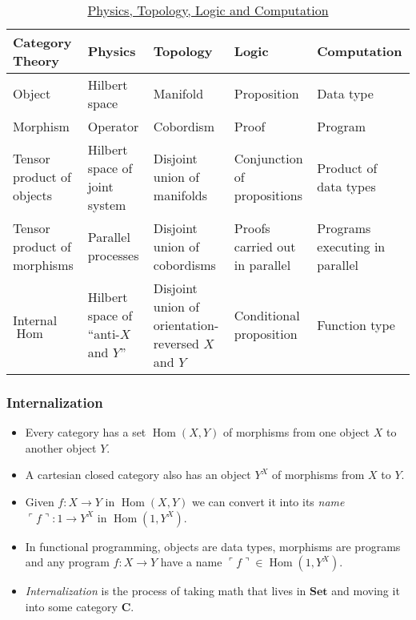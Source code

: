 \documentclass[UTF8,11pt,colorlinks,compress,openany]{beamer}%
\begin{document}
\begin{frame}\frametitle{}
\begin{table}[H]
	\begin{tabu}{p{.165\textwidth}|p{.165\textwidth}|p{.165\textwidth}|p{.165\textwidth}|p{.165\textwidth}}
	\hline
	\textbf{Category Theory} & \textbf{Physics} & \textbf{Topology} & \textbf{Logic} & \textbf{Computation}\\
	\hline
	Object & Hilbert space & Manifold & Proposition & Data type\\
	\hline
	Morphism & Operator & Cobordism & Proof & Program\\
	\hline
	Tensor product of objects & Hilbert space of joint system & Disjoint union of manifolds & Conjunction of propositions & Product of data types\\
	\hline
	Tensor product of morphisms & Parallel processes & Disjoint union of cobordisms & Proofs carried out in parallel & Programs executing in parallel\\
	\hline
	Internal $\operatorname{Hom}$ & Hilbert space of ``anti-$X$ and $Y$'' & Disjoint union of orientation-reversed $X$ and $Y$ & Conditional proposition & Function type\\
	\hline
	\end{tabu}\caption{\href{https://arxiv.org/abs/0903.0340}{Physics, Topology, Logic and Computation}}
\end{table}
\end{frame}

\begin{frame}\frametitle{Internalization}
\begin{itemize}
	\item Every category has a set $\operatorname{Hom}(X,Y)$ of morphisms from one object $X$ to another object $Y$.
	\item A cartesian closed category also has an object $Y^X$ of morphisms from $X$ to $Y$.
	\item Given $f: X\to Y$ in $\operatorname{Hom}(X,Y)$ we can convert it into its \emph{name} $\ulcorner f\urcorner: 1\to Y^X$ in $\operatorname{Hom}(1,Y^X)$.
	\item In functional programming, objects are data types, morphisms are programs and any program $f:X\to Y$ have a name $\ulcorner f\urcorner\in\operatorname{Hom}(1,Y^X)$.
	\item \emph{Internalization} is the process of taking math that lives in $\mathbf{Set}$ and moving it into some category $\mathbf{C}$.
\end{itemize}
\end{frame}
\end{document}
